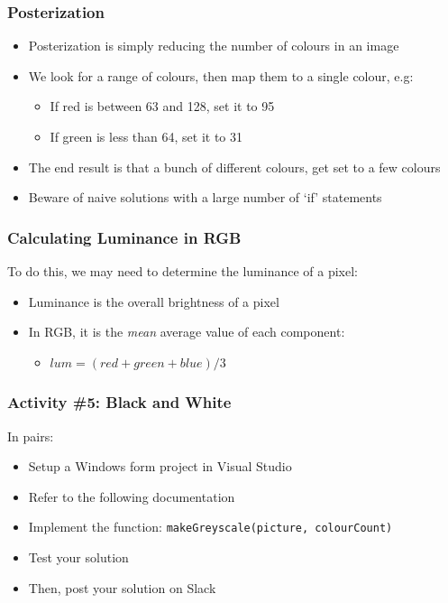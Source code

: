 \begin{frame}
	\frametitle{Posterization}
	
	\begin{itemize}			
		\item Posterization is simply reducing the number of colours in an image
		\item We look for a range of colours, then map them to a single colour, e.g:
		\begin{itemize}
			\item If red is between 63 and 128, set it to 95
			\item If green is less than 64, set it to 31
		\end{itemize}	
		\item The end result is that a bunch of different colours, get set to a few colours
		\item Beware of naive solutions with a large number of `if' statements
	\end{itemize}
\end{frame}


\begin{frame}
	\frametitle{Calculating Luminance in RGB}
	
	To do this, we may need to determine the luminance of a pixel:
	
	\begin{itemize}		
		\item Luminance is the overall brightness of a pixel
		\item In RGB, it is the \textit{mean} average value of each component:
		\begin{itemize}
			\item $lum = (red + green + blue) / 3$
		\end{itemize}	
	\end{itemize}
\end{frame}



\begin{frame}
	\frametitle{Activity \#5: Black and White}
	
	In pairs:
	
	\vspace{2em}
	
	\begin{itemize}		
		\item Setup a Windows form project in Visual Studio
		\item Refer to the following documentation
		\item Implement the function: \texttt{makeGreyscale(picture, colourCount)}
		\item Test your solution
		\item Then, post your solution on Slack
	\end{itemize}
\end{frame}

